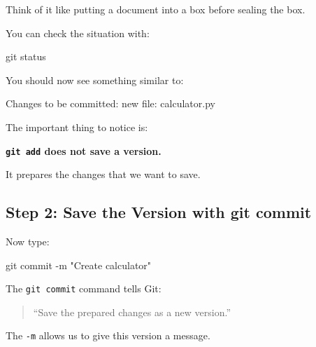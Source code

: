 \documentclass[11pt,a4paper]{article}
\begin{document}
Think of it like putting a document into a box before sealing the box.

\begin{center}
\end{center}

You can check the situation with:

\begin{code}
git status
\end{code}

You should now see something similar to:

\begin{code}
Changes to be committed:
    new file: calculator.py
\end{code}

The important thing to notice is:

\begin{center}
\textbf{\texttt{git add} does not save a version.}
\end{center}

It prepares the changes that we want to save.





\subsection{Step 2: Save the Version with git commit}

Now type:

\begin{code}
git commit -m "Create calculator"
\end{code}

The \texttt{git commit} command tells Git:

\begin{quote}
``Save the prepared changes as a new version.''
\end{quote}

The \texttt{-m} allows us to give this version a message.
\end{document}
